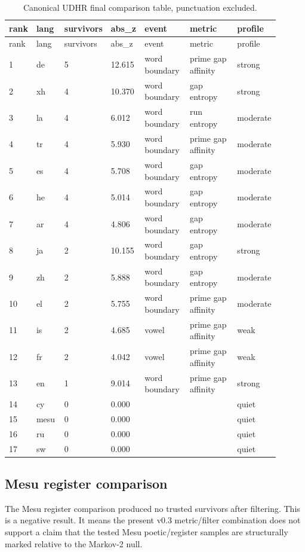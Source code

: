 \documentclass[11pt,a4paper]{article}
\begin{document}
\begingroup
\scriptsize
\setlength{\tabcolsep}{3pt}
\renewcommand{\arraystretch}{1.12}
\begin{longtable}{p{0.05\linewidth}p{0.11\linewidth}p{0.11\linewidth}p{0.10\linewidth}p{0.18\linewidth}p{0.25\linewidth}p{0.10\linewidth}}
\caption{Canonical UDHR final comparison table, punctuation excluded.}\label{tab:canonical-nopunc}\\
\toprule
rank & lang & survivors & abs\_z & event & metric & profile \\
\midrule
\endfirsthead
\toprule
rank & lang & survivors & abs\_z & event & metric & profile \\
\midrule
\endhead
1 & de & 5 & 12.615 & word boundary & prime gap affinity & strong \\
2 & xh & 4 & 10.370 & word boundary & gap entropy & strong \\
3 & la & 4 & 6.012 & word boundary & run entropy & moderate \\
4 & tr & 4 & 5.930 & word boundary & prime gap affinity & moderate \\
5 & es & 4 & 5.708 & word boundary & gap entropy & moderate \\
6 & he & 4 & 5.014 & word boundary & gap entropy & moderate \\
7 & ar & 4 & 4.806 & word boundary & gap entropy & moderate \\
8 & ja & 2 & 10.155 & word boundary & gap entropy & strong \\
9 & zh & 2 & 5.888 & word boundary & gap entropy & moderate \\
10 & el & 2 & 5.755 & word boundary & prime gap affinity & moderate \\
11 & is & 2 & 4.685 & vowel & prime gap affinity & weak \\
12 & fr & 2 & 4.042 & vowel & prime gap affinity & weak \\
13 & en & 1 & 9.014 & word boundary & prime gap affinity & strong \\
14 & cy & 0 & 0.000 &  &  & quiet \\
15 & mesu & 0 & 0.000 &  &  & quiet \\
16 & ru & 0 & 0.000 &  &  & quiet \\
17 & sw & 0 & 0.000 &  &  & quiet \\
\bottomrule
\end{longtable}
\endgroup

\subsection{Mesu register comparison}
The Mesu register comparison produced no trusted survivors after filtering. This is a negative result. It means the present v0.3 metric/filter combination does not support a claim that the tested Mesu poetic/register samples are structurally marked relative to the Markov-2 null.
\end{document}
